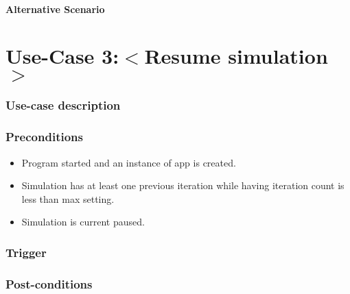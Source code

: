 \documentclass[notitlepage]{article}
\begin{document}
\subsection{Alternative Scenario}\label{subsec:alternative:scenario}

\begin{comment}
	\begin{itemize}
  		\item No alternative scenarios.
	\end{itemize}
\end{comment}
\pagebreak


\part{\LARGE Use-Case 3:$<$Resume simulation$>$}

\section{Use-case description}

\begin{comment}
	{\noindent The simulation restart.}
\end{comment}


\section{Preconditions}

\begin{itemize}
	\item Program started and an instance of app is created.
	\item Simulation has at least one previous iteration while having iteration count is less than max setting.
	\item Simulation is current paused.
\end{itemize}

\section{Trigger}\label{sec:trigger}

\begin{comment}
     \noindent Pause/Resume button is clicked
\end{comment}

\section{Post-conditions}\label{sec:postconditions}
\end{document}

